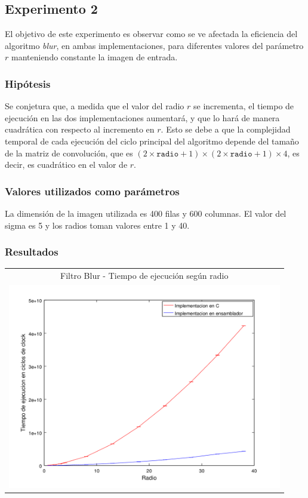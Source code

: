 	\subsection{Experimento 2}
		El objetivo de este experimento es observar como se ve afectada la eficiencia del algoritmo \emph{blur}, en ambas implementaciones, para diferentes valores del parámetro $r$ manteniendo constante la imagen de entrada.

		\subsubsection*{Hipótesis} 
			Se conjetura que, a medida que el valor del radio $r$ se incrementa, el tiempo de ejecución en las dos implementaciones aumentará, y que lo hará de manera cuadrática con respecto al incremento en $r$. Esto se debe a que la complejidad temporal de cada ejecución del ciclo principal del algoritmo depende del tamaño de la matriz de convolución, que es $(2 \times \mathtt{radio} + 1) \times (2 \times \mathtt{radio} + 1) \times 4$, es decir, es cuadrático en el valor de $r$.

		\subsubsection*{Valores utilizados como parámetros} 
		La dimensión de la imagen utilizada es 400 filas y 600 columnas. El valor del sigma es 5 y los radios toman valores entre 1 y 40.

		\subsubsection*{Resultados}

			{\centering \begin{tabular}{c}
	      		{\small Filtro Blur - Tiempo de ejecución según radio} \\
	      		\includegraphics[width=12cm]{../exp/graficos/exp2-tiempo_segun_radio.png} \\
	    	\end{tabular}}

